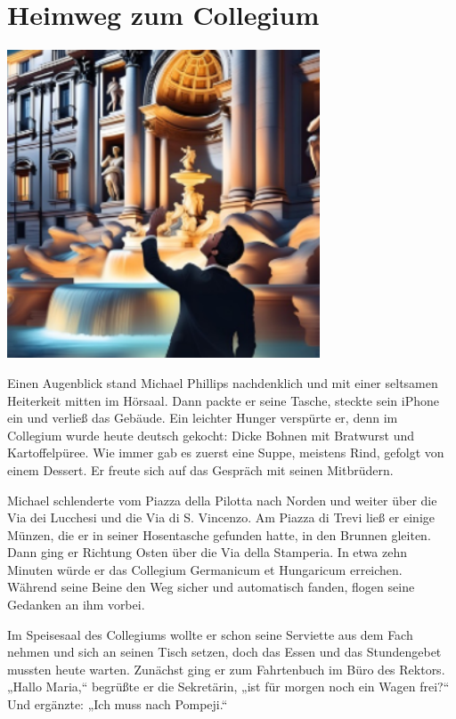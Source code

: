\documentclass[
]{article}
\begin{document}
\section{Heimweg zum Collegium}\label{heimweg-zum-collegium}

\includegraphics[width=3.6596in,height=3.61705in]{media/image16.png}

Einen Augenblick stand Michael Phillips nachdenklich und mit einer
seltsamen Heiterkeit mitten im Hörsaal. Dann packte er seine Tasche,
steckte sein iPhone ein und verließ das Gebäude. Ein leichter Hunger
verspürte er, denn im Collegium wurde heute deutsch gekocht: Dicke
Bohnen mit Bratwurst und Kartoffelpüree. Wie immer gab es zuerst eine
Suppe, meistens Rind, gefolgt von einem Dessert. Er freute sich auf das
Gespräch mit seinen Mitbrüdern.

Michael schlenderte vom Piazza della Pilotta nach Norden und weiter über
die Via dei Lucchesi und die Via di S. Vincenzo. Am Piazza di Trevi ließ
er einige Münzen, die er in seiner Hosentasche gefunden hatte, in den
Brunnen gleiten. Dann ging er Richtung Osten über die Via della
Stamperia. In etwa zehn Minuten würde er das Collegium Germanicum et
Hungaricum erreichen. Während seine Beine den Weg sicher und automatisch
fanden, flogen seine Gedanken an ihm vorbei.

Im Speisesaal des Collegiums wollte er schon seine Serviette aus dem
Fach nehmen und sich an seinen Tisch setzen, doch das Essen und das
Stundengebet mussten heute warten. Zunächst ging er zum Fahrtenbuch im
Büro des Rektors. „Hallo Maria,`` begrüßte er die Sekretärin, „ist für
morgen noch ein Wagen frei?{\kern0pt}`` Und ergänzte: „Ich muss nach
Pompeji.``
\end{document}
